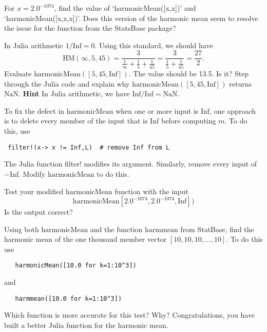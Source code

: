 \documentclass[12pt,fleqn]{exam}
\newcommand{\HM}{\mathrm{HM}}
\newcommand{\Inf}{\mathrm{Inf}}
\begin{document}
\begin{questions}  
\question[1] For $x = 2.0^{-1074}$, find the value of `harmonicMean([x,x])'  and `harmonicMean([x,x,x])'. Does this
version of the harmonic mean seem to resolve the issue for the function from the StatsBase package?


\question[1] In Julia arithmetic $1/\Inf = 0$.  Using this standard, we should have
  \begin{equation*}
  \HM(\infty, 5,45) = \frac{3}{\frac{1}{\infty} +  \frac{1}{5} + \frac{1}{45} } =
                           \frac{3}{\frac{1}{5} + \frac{1}{45} }
                           = \frac{27}{2}.
\end{equation*}
Evaluate $\mathrm{harmonicMean}([5,45,\Inf])$. The value should be 13.5. Is it?  Step through the Julia code and
explain why $\mathrm{harmonicMean}([5,45,\Inf])$ returns $\mathrm{NaN}$.  \textbf{Hint}  In Julia arithmetic,
we have $\Inf/\Inf = \mathrm{NaN}$.

\question [1] To fix the defect in $\mathrm{harmonicMean}$ when one or more input is $\Inf$, one approach is to
delete every member of the input that is $\Inf$ before computing $m$. To do this, use
\begin{verbatim}
 filter!(x-> x != Inf,L)  # remove Inf from L
\end{verbatim}
The Julia function filter! modifies its argument. Similarly, remove every input of $-\Inf$. Modify  $\mathrm{harmonicMean}$  to do this.

\question [1] Test your modified  $\mathrm{harmonicMean}$  function with the input  
\begin{equation}
 \mathrm{harmonicMean}[2.0^{-1074},2.0^{-1074}, \Inf])
 \end{equation}
  Is the output correct? 

\question [1] Using both $\mathrm{harmonicMean}$ and the function $\mathrm{harmmean}$ from StatBase,
find the harmonic mean of the one thousand member vector $[10,10, 10, \dots, 10]$. To do this use
\begin{verbatim}
   harmonicMean([10.0 for k=1:10^3])
\end{verbatim}
and
\begin{verbatim}
   harmmean([10.0 for k=1:10^3])
\end{verbatim}
Which function is more accurate for this test? Why? Congratulations, you have built a better Julia function for the harmonic mean.

\end{questions}
\end{document}
